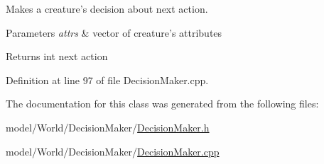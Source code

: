 Makes a creature's decision about next action. 


\begin{DoxyParams}{Parameters}
{\em attrs} & vector of creature's attributes \\
\hline
\end{DoxyParams}
\begin{DoxyReturn}{Returns}
int next action 
\end{DoxyReturn}


Definition at line 97 of file Decision\-Maker.\-cpp.



The documentation for this class was generated from the following files\-:\begin{DoxyCompactItemize}
\item 
model/\-World/\-Decision\-Maker/\hyperlink{DecisionMaker_8h}{Decision\-Maker.\-h}\item 
model/\-World/\-Decision\-Maker/\hyperlink{DecisionMaker_8cpp}{Decision\-Maker.\-cpp}\end{DoxyCompactItemize}
